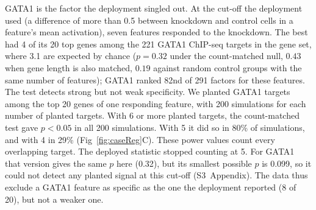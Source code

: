 GATA1 is the factor the deployment singled out. At the cut-off the
deployment used (a difference of more than 0.5 between knockdown and
control cells in a feature's mean activation), seven features responded
to the knockdown. The best had 4 of its 20 top genes among the
221 GATA1 ChIP-seq targets in the gene set, where 3.1 are expected by
chance ($p = 0.32$ under the count-matched null, $0.43$ when gene length
is also matched, $0.19$ against random control groups with the same
number of features); GATA1 ranked 82nd of 291 factors for these
features. The test detects strong but not weak specificity. We planted
GATA1 targets among the top 20 genes of one responding feature, with 200
simulations for each number of planted targets. With 6 or more planted
targets, the count-matched test gave $p < 0.05$ in all 200 simulations.
With 5 it did so in 80\% of simulations, and with 4 in 29\%
(Fig~\ref{fig:caseReg}C). These power values count every overlapping
target. The deployed statistic stopped counting at 5. For GATA1 that
version gives the same $p$ here (0.32), but its smallest possible $p$ is
0.099, so it could not detect any planted signal at this cut-off
(S3~Appendix). The data thus exclude a GATA1 feature as specific as the
one the deployment reported (8 of 20), but not a weaker one.

